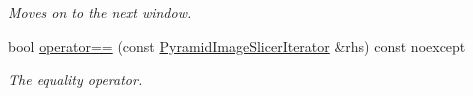 \begin{DoxyCompactItemize}
\begin{DoxyCompactList}\small\item\em Moves on to the next window. \end{DoxyCompactList}\item 
bool \hyperlink{group___imagery_module_gac660f2df0d221e909f0ccf3e503e8c26}{operator==} (const \hyperlink{classdg_1_1deepcore_1_1imagery_1_1_pyramid_image_slicer_iterator}{Pyramid\+Image\+Slicer\+Iterator} \&rhs) const noexcept
\begin{DoxyCompactList}\small\item\em The equality operator. \end{DoxyCompactList}\end{DoxyCompactItemize}
